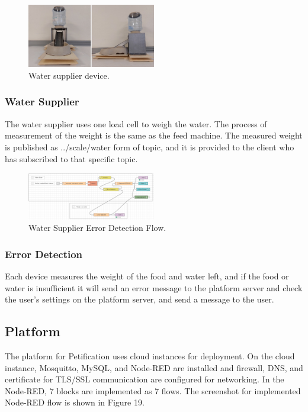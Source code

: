 \documentclass[conference]{IEEEtran}
\begin{document}
\begin{figure}[htbp]
\centerline{\includegraphics[width=0.5\textwidth]{./images/Water Supplier.jpg}}
\caption{Water supplier device.}
\label{fig}
\end{figure}


\subsubsection{Water Supplier}
The water supplier uses one load cell to weigh the water. The process of measurement of the
weight is the same as the feed machine. The measured weight is published as ../scale/water form
of topic, and it is provided to the client who has subscribed to that specific topic.

\begin{figure}[htbp]
\centerline{\includegraphics[width=0.5\textwidth]{./images/Water Supplier Error Detection.png}}
\caption{Water Supplier Error Detection Flow.}
\label{fig}
\end{figure}

\subsubsection{Error Detection}
Each device measures the weight of the food and water left, and if the food or water is
insufficient it will send an error message to the platform server and check the user’s settings on
the platform server, and send a message to the user.

\subsection{Platform}
The platform for Petification uses cloud instances for deployment. On the cloud instance, Mosquitto, MySQL, and Node-RED are installed and firewall, DNS, and certificate for TLS/SSL communication are configured for networking. In the Node-RED, 7 blocks are implemented as 7 flows. The screenshot for implemented Node-RED flow is shown in Figure 19.
\end{document}
